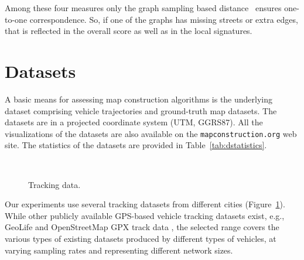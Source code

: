\documentclass[natbib]{svjour3}                    \smartqed  \usepackage[table]{xcolor}
\begin{document}
Among these four measures only the graph sampling based distance~\cite{Biagioni:2012:MIF:2424321.2424333} ensures one-to-one correspondence. 
So, if one of the graphs has missing streets or extra edges, that is reflected in the overall score as well as in the local signatures.



\section{Datasets}
\label{sec:sec_data}

A basic means for assessing map construction algorithms is the underlying dataset comprising vehicle trajectories and ground-truth map datasets. The datasets are in a projected coordinate system (UTM, GGRS87). All the visualizations of the datasets are also available on the {\tt mapconstruction.org} web site. The statistics of the datasets are provided in Table~\ref{tab:dstatistics}.

\begin{figure}[htbp]
 \begin{center}
	 \\
 \end{center}
\caption{Tracking data.}
\label{fig:tracking}
\end{figure}



Our experiments use several tracking datasets from different cities (Figure~\ref{fig:tracking}).
While other publicly available GPS-based vehicle tracking datasets exist, e.g., GeoLife \cite{journals/debu/ZhengXM10} and OpenStreetMap GPX track data \cite{osmgps}, 
the selected range covers the various types of existing datasets produced by different types of vehicles, at varying sampling rates and representing different network sizes. 
\end{document}
